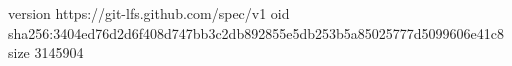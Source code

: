 version https://git-lfs.github.com/spec/v1
oid sha256:3404ed76d2d6f408d747bb3c2db892855e5db253b5a85025777d5099606e41c8
size 3145904
